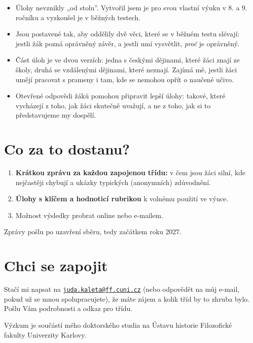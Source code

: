 \documentclass[
  12pt,
  english,
  a4paper,
  extrafontsizes,onecolumn,openright
  ]{memoir}
\providecommand{\tightlist}{%
  \setlength{\itemsep}{0pt}\setlength{\parskip}{0pt}}
\begin{document}
\begin{itemize}
\tightlist
\item
  Úlohy nevznikly „od stolu''. Vytvořil jsem je pro svou vlastní výuku
  v 8. a 9. ročníku a vyzkoušel je v běžných testech.
\item
  Jsou postavené tak, aby oddělily dvě věci, které se v běžném testu
  slévají: jestli žák pozná oprávněný závěr, a jestli umí vysvětlit,
  \emph{proč} je oprávněný.
\item
  Část úloh je ve dvou verzích: jedna s českými dějinami, které žáci
  znají ze školy, druhá se vzdálenými dějinami, které neznají. Zajímá
  mě, jestli žáci umějí pracovat s prameny i tam, kde se nemohou opřít
  o naučené učivo.
\item
  Otevřené odpovědi žáků pomohou připravit lepší úlohy: takové, které
  vycházejí z toho, jak žáci skutečně uvažují, a ne z toho, jak si to
  představujeme my dospělí.
\end{itemize}

\section{Co za to dostanu?}\label{co-za-to-dostanu}

\begin{enumerate}
\def\labelenumi{\arabic{enumi}.}
\tightlist
\item
  \textbf{Krátkou zprávu za každou zapojenou třídu:} v čem jsou žáci silní,
  kde nejčastěji chybují a ukázky typických (anonymních) zdůvodnění.
\item
  \textbf{Úlohy s klíčem a hodnoticí rubrikou} k volnému použití ve výuce.
\item
  Možnost výsledky probrat online nebo e-mailem.
\end{enumerate}

Zprávy pošlu po uzavření sběru, tedy začátkem roku 2027.

\section{Chci se zapojit}\label{chci-se-zapojit}

Stačí mi napsat na \href{mailto:juda.kaleta@ff.cuni.cz}{\nolinkurl{juda.kaleta@ff.cuni.cz}} (nebo odpovědět na můj
e-mail, pokud už se mnou spolupracujete), že máte zájem a kolik tříd by
to zhruba bylo. Pošlu Vám podrobnosti a odkaz pro třídu.

Výzkum je součástí mého doktorského studia na Ústavu historie
Filozofické fakulty Univerzity Karlovy.
\end{document}

